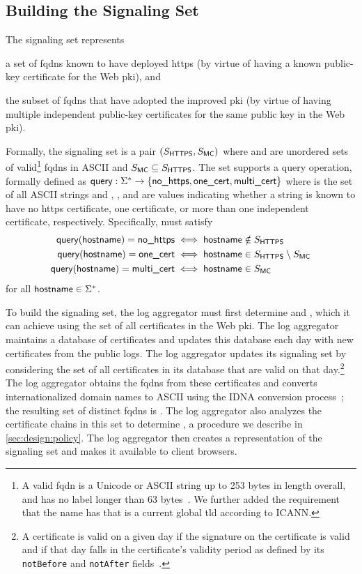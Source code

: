 \subsection{Building the Signaling Set}
\label{sec:design:signaling}

The signaling set represents
\begin{inparaenum}
\item a set of \acp{fqdn} known to have deployed \ac{https} (by virtue of
  having a known public-key certificate for the Web \ac{pki}), and
\item the subset of \acp{fqdn} that have adopted the improved \ac{pki} (by
  virtue of having multiple independent public-key certificates for the same
  public key in the Web \ac{pki}).
\end{inparaenum}
Formally, the signaling set is a pair $(S_{\textsf{HTTPS}}, S_{\textsf{MC}})$ where
\httpsset and \multicertset are unordered sets of valid\footnote{A valid
  \ac{fqdn} is a Unicode or ASCII string up to 253 bytes in length overall, and
  has no label longer than 63 bytes~\cite{rfc1035}. We further added the
requirement that the name has  that is a current global \ac{tld}
according to ICANN.} \acp{fqdn} in ASCII and $S_{\textsf{MC}} \subseteq
S_{\textsf{HTTPS}}$. The set supports a query operation, formally defined as $\textsf{query}:
\Sigma^* \to \{\textsf{no\_https}, \textsf{one\_cert}, \textsf{multi\_cert}\}$ where \strings is the set of
all ASCII strings and \nohttps, \onecert, and \multicert are values indicating
whether a string is  known to have no \ac{https} certificate, one
certificate, or more than one independent certificate, respectively.
Specifically, \query must satisfy
\begin{align*}
  \textsf{query}(\textsf{hostname}) = \textsf{no\_https} &\iff \textsf{hostname} \notin S_{\textsf{HTTPS}} \\
  \textsf{query}(\textsf{hostname}) = \textsf{one\_cert} &\iff \textsf{hostname} \in S_{\textsf{HTTPS}} \setminus
    S_{\textsf{MC}} \\
  \textsf{query}(\textsf{hostname}) = \textsf{multi\_cert} &\iff \textsf{hostname} \in S_{\textsf{MC}}
\end{align*}
for all $\textsf{hostname} \in \Sigma^*$.

To build the signaling set, the log aggregator must first determine \httpsset
and \multicertset, which it can achieve using the set of all certificates in the
Web \ac{pki}. The log aggregator maintains a database of certificates and
updates this database each day with new certificates from the public logs. The
log aggregator updates its signaling set by considering the set of all
certificates in its database that are valid on that day.\footnote{A certificate
  is valid on a given day if the signature on the certificate is valid and if
that day falls in the certificate's validity period as defined by its
\texttt{notBefore} and \texttt{notAfter} fields~\cite{rfc5280}.} The log
aggregator obtains the \acp{fqdn} from these certificates and converts
internationalized domain names to ASCII using the IDNA conversion
process~\cite{rfc5891}; the resulting set of distinct \acp{fqdn} is \httpsset.
The log aggregator also analyzes the certificate chains in this set to determine
\multicertset, a procedure we describe in \autoref{sec:design:policy}. The log
aggregator then creates a representation of the signaling set and makes it
available to client browsers.


